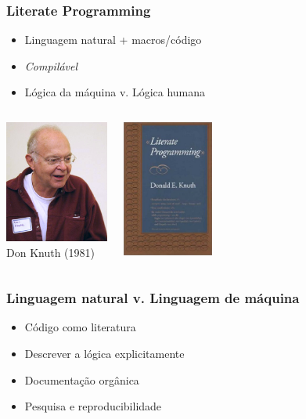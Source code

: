 \documentclass{beamer}
\begin{document}
\begin{frame}
  \frametitle{Literate Programming}
  \begin{itemize}
  \item Linguagem natural + macros/código
  \item \emph{Compilável}
  \item Lógica da máquina v. Lógica humana
  \end{itemize}
  \begin{columns}
    \column{5cm}
    \begin{center}
      \includegraphics[width=3.4cm]{knuth.jpg}\\
      Don Knuth (1981)
    \end{center}
    \column{5cm}
    \begin{center}
      \includegraphics[width=3cm]{Literate_Programming_book_cover.jpg}
    \end{center}
  \end{columns}
\end{frame}

\begin{frame}
  \frametitle{Linguagem natural v. Linguagem de máquina}
  \begin{itemize}
  \item Código como literatura
  \item Descrever a lógica explicitamente
  \item Documentação orgânica
  \item \alert{Pesquisa e reproducibilidade}
  \end{itemize}
\end{frame}
\end{document}
